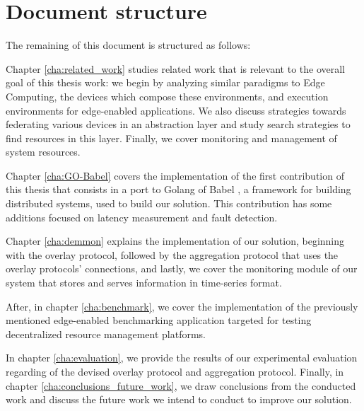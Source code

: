 \section{Document structure}

The remaining of this document is structured as follows: 

Chapter \ref{cha:related_work} studies related work that is relevant to the overall goal of this thesis work: we begin by analyzing similar paradigms to Edge Computing, the devices which compose these environments, and execution environments for edge-enabled applications. We also discuss strategies towards federating various devices in an abstraction layer and study search strategies to find resources in this layer. Finally, we cover monitoring and management of system resources.

Chapter \ref{cha:GO-Babel} covers the implementation of the first contribution of this thesis that consists in a port to Golang of Babel \cite{babel}, a framework for building distributed systems, used to build our solution. This contribution has some additions focused on latency measurement and fault detection.

Chapter \ref{cha:demmon} explains the implementation of our solution, beginning with the overlay protocol, followed by the aggregation protocol that uses the overlay protocols' connections, and lastly, we cover the monitoring module of our system that stores and serves information in time-series format.

After, in chapter \ref{cha:benchmark}, we cover the implementation of the previously mentioned edge-enabled benchmarking application targeted for testing decentralized resource management platforms.

In chapter \ref{cha:evaluation}, we provide the results of our experimental evaluation regarding of the devised overlay protocol and aggregation protocol. Finally, in chapter \ref{cha:conclusions_future_work}, we draw conclusions from the conducted work and discuss the future work we intend to conduct to improve our solution.